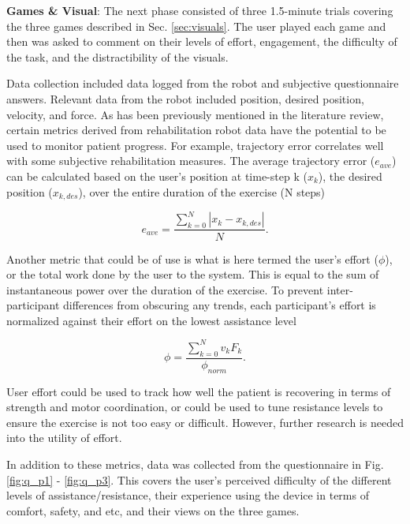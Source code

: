 \documentclass[12pt]{report}
\begin{document}
\textbf{Games \& Visual}: The next phase consisted of three 1.5-minute trials covering the three games described in Sec. \ref{sec:visuals}. The user played each game and then was asked to comment on their levels of effort, engagement, the difficulty of the task, and the distractibility of the visuals. 

Data collection included data logged from the robot and subjective questionnaire answers. Relevant data from the robot included position, desired position, velocity, and force. As has been previously mentioned in the literature review, certain metrics derived from rehabilitation robot data have the potential to be used to monitor patient progress. For example, trajectory error correlates well with some subjective rehabilitation measures. The average trajectory error ($e_{ave}$) can be calculated based on the user's position at time-step k ($x_k$), the desired position ($x_{k,des}$), over the entire duration of the exercise (N steps)

\begin{equation} \label{eqn:error}
e_{ave} = \frac{\sum_{k=0}^{N} |x_k - x_{k,des}|}{N}.
\end{equation}

Another metric that could be of use is what is here termed the user's effort ($\phi$), or the total work done by the user to the system. This is equal to the sum of instantaneous power over the duration of the exercise. To prevent inter-participant differences from obscuring any trends, each participant's effort is normalized against their effort on the lowest assistance level 

\begin{equation} \label{eqn:effort} 
\phi = \frac{\sum_{k=0}^{N} v_kF_k}{\phi _{norm}}.
\end{equation}

User effort could be used to track how well the patient is recovering in terms of strength and motor coordination, or could be used to tune resistance levels to ensure the exercise is not too easy or difficult. However, further research is needed into the utility of effort. 

In addition to these metrics, data was collected from the questionnaire in Fig.\ref{fig:q_p1} - \ref{fig:q_p3}. This covers the user's perceived difficulty of the different levels of assistance/resistance, their experience using the device in terms of comfort, safety, and etc, and their views on the three games.
\end{document}

